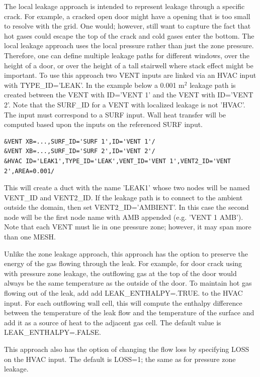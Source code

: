 \documentclass[11pt]{book}
\begin{document}
The local leakage approach is intended to represent leakage through a specific crack. For example, a cracked open door might have a opening that is too small to resolve with the grid.  One would; however, still want to capture the fact that hot gases could escape the top of the crack and cold gases enter the bottom. The local leakage approach uses the local pressure rather than just the zone pressure. Therefore, one can define multiple leakage paths for different windows, over the height of a door, or over the height of a tall stairwell where stack effect might be important. To use this approach two {\ct VENT} inputs are linked via an {\ct HVAC} input with {\ct TYPE\_ID='LEAK'}. In the example below a 0.001 m$^2$ leakage path is created between the {\ct VENT} with {\ct ID='VENT 1'} and the {\ct VENT} with {\ct ID='VENT 2'}. Note that the {\ct SURF\_ID} for a {\ct VENT} with localized leakage is not {\ct 'HVAC'}. The input must correspond to a {\ct SURF} input. Wall heat transfer will be computed based upon the inputs on the referenced {\ct SURF} input.
\begin{lstlisting}
&VENT XB=...,SURF_ID='SURF 1',ID='VENT 1'/
&VENT XB=...,SURF_ID='SURF 2',ID='VENT 2'/
&HVAC ID='LEAK1',TYPE_ID='LEAK',VENT_ID='VENT 1',VENT2_ID='VENT 2',AREA=0.001/
\end{lstlisting}
This will create a duct with the name {\ct 'LEAK1'} whose two nodes will be named {\ct VENT\_ID} and {\ct VENT2\_ID}. If the leakage path is to connect to the ambient outside the domain, then set {\ct VENT2\_ID='AMBIENT'}. In this case the second node will be the first node name with {\ct AMB} appended (e.g. {\ct 'VENT 1 AMB'}). Note that each {\ct VENT} must lie in one pressure zone; however, it may span more than one {\ct MESH}.

Unlike the zone leakage approach, this approach has the option to preserve the energy of the gas flowing through the leak. For example, for door crack using with pressure zone leakage, the outflowing gas at the top of the door would always be the same temperature as the outside of the door. To maintain hot gas flowing out of the leak, add add {\ct LEAK\_ENTHALPY=.TRUE.} to the {\ct HVAC} input. For each outflowing wall cell, this will compute the enthalpy difference between the temperature of the leak flow and the temperature of the surface and add it as a source of heat to the adjacent gas cell.  The default value is {\ct LEAK\_ENTHALPY=.FALSE.}

This approach also has the option of changing the flow loss by specifying {\ct LOSS} on the {\ct HVAC} input.  The default is {\ct LOSS=1}; the same as for pressure zone leakage.
\end{document}

